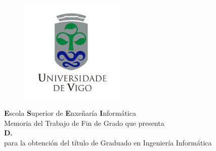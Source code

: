 

\begin{titlepage}
    \phantom{nice trick}\\
    \vspace{0.5cm}
    \begin{figure}[h]
        \centering
        \includegraphics[width=5cm]{img/uvigo.png}
    \end{figure}
    
    \begin{center}
        \Large{
            \textbf{E}scola
            \textbf{S}uperior de
            \textbf{E}nxeñaría
            \textbf{I}nformática
        }\\
        \vspace{2.5cm}
        \large{Memoria del Trabajo de Fin de Grado que presenta}\\
        \vspace{0.5cm}
        \Large{
            \textbf{D. \autor}
        }\\
        \vspace{0.5cm}
        \large{para la obtención del título de Graduado en Ingeniería Informática}\\
        \vspace{2cm}
        \LARGE{ \textbf{\titulo} }\\
    \end{center}
    

\end{titlepage}
